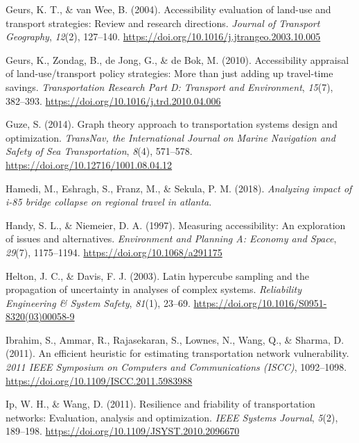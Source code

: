 \documentclass[
  letterpaper,
  number,
  review,
  3p]{elsarticle}
\newlength{\cslhangindent}
\newlength{\cslentryspacingunit} %
\newenvironment{CSLReferences}[2] %
 {%
  \setlength{\parindent}{0pt}
  \ifodd #1
  \let\oldpar\par
  \def\par{\hangindent=\cslhangindent\oldpar}
  \fi
  \setlength{\parskip}{#2\cslentryspacingunit}
 }%
 {}
\begin{document}
\begin{CSLReferences}{1}{0}
\leavevmode{}%
Geurs, K. T., \& van Wee, B. (2004). Accessibility evaluation of
land-use and transport strategies: Review and research directions.
\emph{Journal of Transport Geography}, \emph{12}(2), 127--140.
\url{https://doi.org/10.1016/j.jtrangeo.2003.10.005}

\leavevmode{}%
Geurs, K., Zondag, B., de Jong, G., \& de Bok, M. (2010). Accessibility
appraisal of land-use/transport policy strategies: More than just adding
up travel-time savings. \emph{Transportation Research Part D: Transport
and Environment}, \emph{15}(7), 382--393.
\url{https://doi.org/10.1016/j.trd.2010.04.006}

\leavevmode{}%
Guze, S. (2014). Graph theory approach to transportation systems design
and optimization. \emph{TransNav, the International Journal on Marine
Navigation and Safety of Sea Transportation}, \emph{8}(4), 571--578.
\url{https://doi.org/10.12716/1001.08.04.12}

\leavevmode{}%
Hamedi, M., Eshragh, S., Franz, M., \& Sekula, P. M. (2018).
\emph{Analyzing impact of i-85 bridge collapse on regional travel in
atlanta}.

\leavevmode{}%
Handy, S. L., \& Niemeier, D. A. (1997). Measuring accessibility: An
exploration of issues and alternatives. \emph{Environment and Planning
A: Economy and Space}, \emph{29}(7), 1175--1194.
\url{https://doi.org/10.1068/a291175}

\leavevmode{}%
Helton, J. C., \& Davis, F. J. (2003). Latin hypercube sampling and the
propagation of uncertainty in analyses of complex systems.
\emph{Reliability Engineering \& System Safety}, \emph{81}(1), 23--69.
\url{https://doi.org/10.1016/S0951-8320(03)00058-9}

\leavevmode{}%
Ibrahim, S., Ammar, R., Rajasekaran, S., Lownes, N., Wang, Q., \&
Sharma, D. (2011). An efficient heuristic for estimating transportation
network vulnerability. \emph{2011 IEEE Symposium on Computers and
Communications (ISCC)}, 1092--1098.
\url{https://doi.org/10.1109/ISCC.2011.5983988}

\leavevmode{}%
Ip, W. H., \& Wang, D. (2011). Resilience and friability of
transportation networks: Evaluation, analysis and optimization.
\emph{IEEE Systems Journal}, \emph{5}(2), 189--198.
\url{https://doi.org/10.1109/JSYST.2010.2096670}


\end{CSLReferences}
\end{document}

